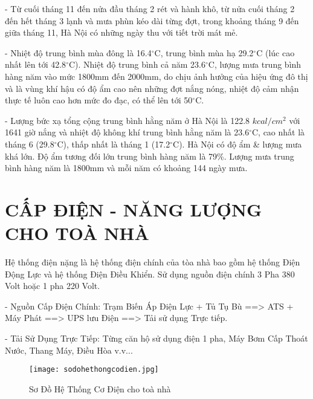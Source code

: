 	- Từ cuối tháng 11 đến nửa đầu tháng 2 rét và hành khô, từ nửa cuối tháng 2 đến hết tháng 3 lạnh và mưa phùn kéo dài từng đợt, trong khoảng tháng 9 đến giữa tháng 11, Hà Nội có những ngày thu với tiết trời mát mẻ.
	
	- Nhiệt độ trung bình mùa đông là 16.4$^{\circ}$C, trung bình mùa hạ 29.2$^{\circ}$C (lúc cao nhất lên tới 42.8$^{\circ}$C). Nhiệt độ trung bình cả năm 23.6$^{\circ}$C, lượng mưa trung bình hàng năm vào mức 1800mm đến 2000mm, do chịu ảnh hưởng của hiệu ứng đô thị và là vùng khí hậu có độ ẩm cao nên những đợt nắng nóng, nhiệt độ cảm nhận thực tế luôn cao hơn mức đo đạc, có thể lên tới 50$^{\circ}$C.
	
	- Lượng bức xạ tổng cộng trung bình hằng năm ở Hà Nội là 122.8 $ kcal/cm^{2} $ với 1641 giờ nắng và nhiệt độ không khí trung bình hằng năm là 23.6$^{\circ}$C, cao nhất là tháng 6 (29.8$^{\circ}$C), thấp nhất là tháng 1 (17.2$^{\circ}$C). Hà Nội có độ ẩm \& lượng mưa khá lớn. Độ ẩm tương đối lớn trung bình hàng năm là 79\%. Lượng mưa trung bình hàng năm là 1800mm và mỗi năm có khoảng 144 ngày mưa.
	
	\section{CẤP ĐIỆN - NĂNG LƯỢNG CHO TOÀ NHÀ}
	Hệ thống điện nặng là hệ thống điện chính của tòa nhà bao gồm hệ thống Điện Động Lực và hệ thống Điện Điều Khiển. Sử dụng nguồn điện chính 3 Pha 380 Volt hoặc 1 pha 220 Volt.
	
	- Nguồn Cấp Điện Chính:
	Trạm Biến Áp Điện Lực + Tủ Tụ Bù ==> ATS + Máy Phát ==> UPS lưu Điện ==> Tải sử dụng Trực tiếp.
	
	- Tải Sử Dụng Trực Tiếp: Từng căn hộ sử dụng điện 1 pha, Máy Bơm Cấp Thoát Nước, Thang Máy, Điều Hòa v.v...
	
	\begin{figure}[H]
		\centering
		\caption{Sơ Đồ Hệ Thống Cơ Điện cho toà nhà}
		\texttt{[image: sodohethongcodien.jpg]}
	\end{figure}
	